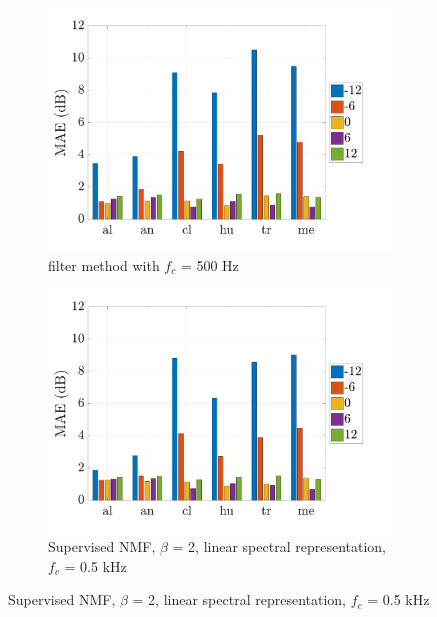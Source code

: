 \documentclass[twocolumn,a4paper,10pt]{article}
\begin{document}
\begin{figure}[t!]
    \centering
    \begin{subfigure}[t]{0.45\textwidth}
        \centering
        \includegraphics[width=\linewidth]{../image/filter_bar.pdf}
        \caption{filter method with $f_c$ = 500 Hz}
        \label{fig:TIR_class_filter}
    \end{subfigure}%
    \hfill
    \begin{subfigure}[t]{0.45\textwidth}
        \centering
        \includegraphics[width=\linewidth]{../image/sup_bar.pdf}
        \caption{Supervised NMF, $\beta$ = 2, linear spectral representation, $f_c$ = 0.5 kHz}
                \label{fig:TIR_class_sup}
    \end{subfigure}
    

\end{figure}
\end{document}
